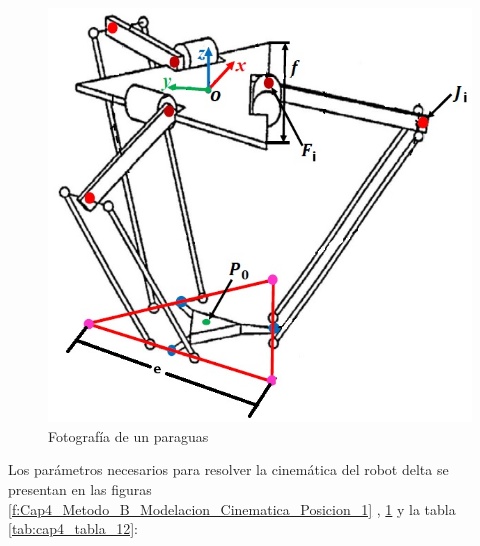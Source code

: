             \begin{figure}[htb]
                 \centering
                 \includegraphics[width=0.6\linewidth]{Main/Chapter4/Images4/DIBUJO25.jpg}
                  \caption{Fotografía de un paraguas}
                  \label{f:Cap4_Metodo_B_Modelacion_Cinematica_Posicion_2}
            \end{figure}        
        
        
        
        Los parámetros necesarios para resolver la cinemática del robot delta se presentan en las figuras  \ref{f:Cap4_Metodo_B_Modelacion_Cinematica_Posicion_1} , \ref{f:Cap4_Metodo_B_Modelacion_Cinematica_Posicion_2} y la  tabla \ref{tab:cap4_tabla_12}:
        
